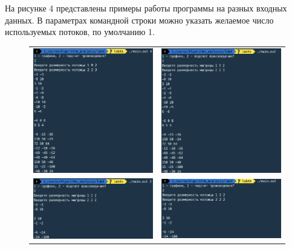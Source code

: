 \documentclass[a4paper,14pt]{article} %
\begin{document}
	На рисунке 4 представлены примеры работы программы на разных входных данных. В параметрах командной строки можно указать желаемое число используемых потоков, по умолчанию 1.
	\begin{figure}[ht]\center
		\begin{tabular}{cc}
			\includegraphics[width=80mm]{ex1} & \includegraphics[width=80mm]{ex2} \\
			\includegraphics[width=80mm]{ex3} & \includegraphics[width=80mm]{ex4} \\

\end{tabular}
\end{figure}
\end{document}
